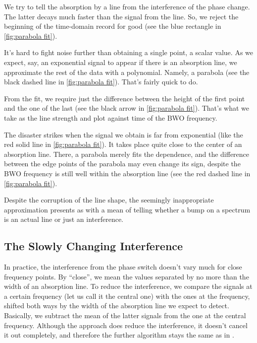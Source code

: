 \documentclass[a4paper]{article}
\begin{document}
We try to tell the absorption by a line from the interference of the phase change. The latter decays much faster than the signal from the line. So, we reject the beginning of the time-domain record for good (see the blue rectangle in \cref{fig:parabola fit}).

It's hard to fight noise further than obtaining a single point, a scalar value. As we expect, say, an exponential signal to appear if there is an absorption line, we approximate the rest of the data with a polynomial. Namely, a parabola (see the black dashed line in \cref{fig:parabola fit}). That's fairly quick to do.

From the fit, we require just the difference between the height of the first point and the one of the last (see the black arrow in \cref{fig:parabola fit}). That's what we take as the line strength and plot against time of the BWO frequency.

The disaster strikes when the signal we obtain is far from exponential (like the red solid line in \cref{fig:parabola fit}). It takes place quite close to the center of an absorption line. There, a parabola merely fits the dependence, and the difference between the edge points of the parabola may even change its sign, despite the BWO frequency is still well within the absorption line (see the red dashed line in \cref{fig:parabola fit}).

Despite the corruption of the line shape, the seemingly inappropriate approximation presents as with a mean of telling whether a bump on a spectrum is an actual line or just an interference.

\subsection{The Slowly Changing Interference}\label{subsec:The Slowly Changing Interference}

In practice, the interference from the phase switch doesn't vary much for close frequency points. By \enquote{close}, we mean the values separated by no more than the width of an absorption line. To reduce the interference, we compare the signals at a certain frequency (let us call it the central one) with the ones at the frequency, shifted both ways by the width of the absorption line we expect to detect. Basically, we subtract the mean of the latter signals from the one at the central frequency. Although the approach does reduce the interference, it doesn't cancel it out completely, and therefore the further algorithm stays the same as in .
\end{document}
